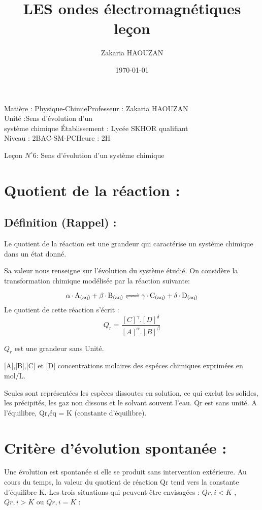 \documentclass[12pt]{article}
\title{LES ondes électromagnétiques leçon}
\author{Zakaria HAOUZAN}
\date{\today}
\newcommand\headerMe[2]{\noindent{}#1\hfill#2}
\begin{document}
\headerMe{Matière : Physique-Chimie}{Professeur : Zakaria HAOUZAN}\\
\headerMe{Unité :Sens d'évolution d'un\\système chimique  }{Établissement : Lycée SKHOR qualifiant}\\
\headerMe{Niveau : 2BAC-SM-PC}{Heure : 2H}\\



\begin{center}

    \Large{Leçon $N^{\circ} 6 $: \color{red}Sens d'évolution d'un système chimique }
\end{center}
\section{Quotient de la réaction :}
\subsection{Définition (Rappel) :}
Le quotient de la réaction est une grandeur qui caractérise un système chimique dans un état donné.

Sa valeur nous renseigne sur l'évolution du système étudié.
On considère la transformation chimique modélisée par la réaction suivante:

$$\ce{\alpha.A_{(aq)} + \beta.B_{(aq)} <=> \gamma.C_{(aq)} + \delta.D_{(aq)}}$$
Le quotient de cette réaction  s'écrit : $$Q_r = \frac{[C]^{\gamma}.[D]^{\delta}}{[A]^{\alpha}.[B]^{\beta}}$$

$Q_r$ est une grandeur sans Unité.

[A],[B],[C] et [D] concentrations molaires des espéces chimiques exprimées en mol/L.
\begin{tcolorbox}
Seules sont représentées les espèces dissoutes en solution, ce qui exclut les solides, les précipités, les
gaz non dissous et le solvant souvent l'eau. Qr est sans unité.
A l'équilibre, Qr,éq = K (constante d'équilibre).
\end{tcolorbox}

\section{Critère d'évolution spontanée : }

Une évolution est spontanée si elle se produit sans intervention extérieure.
Au cours du temps, la valeur du quotient de réaction Qr tend vers la constante d'équilibre K.
Les trois situations qui peuvent être envisagées : $Qr,i < K$ , $Qr,i > K$ ou $Qr,i = K$ :
\end{document}
